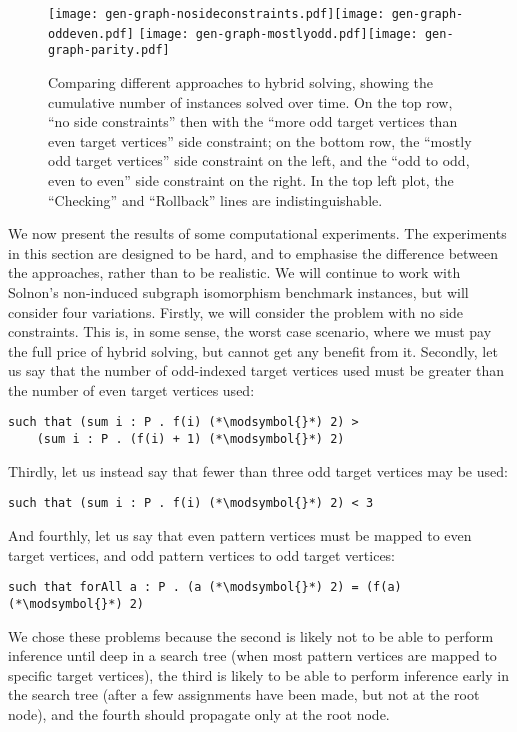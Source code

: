 \documentclass[runningheads]{llncs}
\begin{document}
\begin{figure}[p]
    \texttt{[image: gen-graph-nosideconstraints.pdf]}\hfill\texttt{[image: gen-graph-oddeven.pdf]}
    \bigskip
    \texttt{[image: gen-graph-mostlyodd.pdf]}\hfill\texttt{[image: gen-graph-parity.pdf]}
    \caption{Comparing different approaches to hybrid solving, showing the cumulative number of
    instances solved over time. On the top row, ``no side constraints'' then with the ``more odd
    target vertices than even target vertices'' side constraint; on the bottom row, the ``mostly odd
    target vertices'' side constraint on the left, and the ``odd to odd, even to even'' side
    constraint on the right. In the top left plot, the ``Checking'' and ``Rollback'' lines are
    indistinguishable.}\label{figure:cumulative}
\end{figure}

We now present the results of some computational experiments. The experiments in this section are
designed to be hard, and to emphasise the difference between the approaches, rather
than to be realistic. We will continue to work with Solnon's non-induced subgraph isomorphism
benchmark instances, but will consider four variations. Firstly, we will consider the problem with
no side constraints. This is, in some sense, the worst case scenario, where we must pay the full
price of hybrid solving, but cannot get any benefit from it. Secondly, let us say that the number of
odd-indexed target vertices used must be greater than the number of even target vertices used:
\newcommand{\modsymbol}{\%}
\begin{lstlisting}
such that (sum i : P . f(i) (*\modsymbol{}*) 2) >
    (sum i : P . (f(i) + 1) (*\modsymbol{}*) 2)
\end{lstlisting}
Thirdly, let us instead say that fewer than three odd target vertices may be used:
\begin{lstlisting}
such that (sum i : P . f(i) (*\modsymbol{}*) 2) < 3
\end{lstlisting}
And fourthly, let us say that even pattern vertices must be mapped to even target vertices, and odd
pattern vertices to odd target vertices:
\begin{lstlisting}
such that forAll a : P . (a (*\modsymbol{}*) 2) = (f(a) (*\modsymbol{}*) 2)
\end{lstlisting}

We chose these problems because the second is likely not to be able to
perform inference until deep in a search tree (when most pattern vertices are mapped to specific
target vertices), the third is likely to be able to perform inference early in the search tree
(after a few assignments have been made, but not at the root node), and the fourth should propagate
only at the root node.
\end{document}
